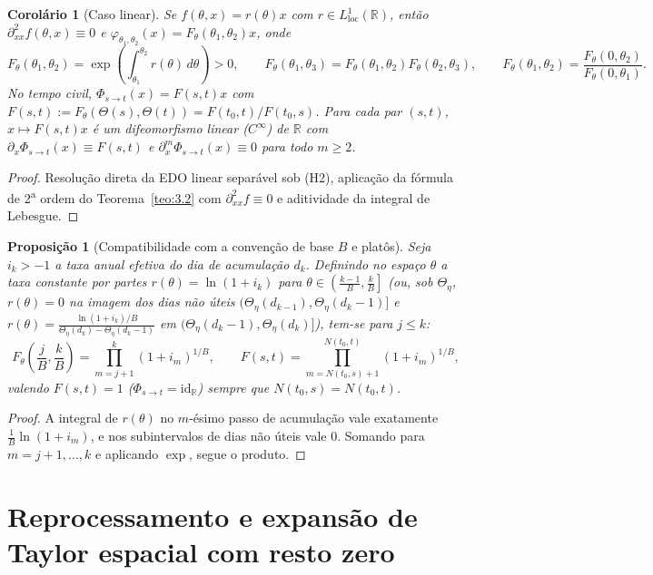 \documentclass[11pt, a4paper]{article}
\theoremstyle{definition}
\theoremstyle{plain}
\newtheorem{proposicao}[definicao]{Proposição}
\newtheorem{corolario}[definicao]{Corolário}
\theoremstyle{remark}
\begin{document}
\begin{corolario}[Caso linear]\label{cor:3.4}
Se $f(\theta, x) = r(\theta)x$ com $r \in L^1_{\text{loc}}(\mathbb{R})$, então $\partial_{xx}^2 f(\theta, x) \equiv 0$ e $\varphi_{\theta_1, \theta_2}(x) = F_\theta(\theta_1, \theta_2)x$, onde
\[
F_\theta(\theta_1, \theta_2) = \exp\left(\int_{\theta_1}^{\theta_2} r(\theta)\,d\theta\right) > 0, \qquad F_\theta(\theta_1, \theta_3) = F_\theta(\theta_1, \theta_2) F_\theta(\theta_2, \theta_3), \qquad F_\theta(\theta_1, \theta_2) = \frac{F_\theta(0, \theta_2)}{F_\theta(0, \theta_1)}.
\]
No tempo civil, $\Phi_{s \to t}(x) = F(s,t)x$ com $F(s,t) := F_\theta(\Theta(s), \Theta(t)) = F(t_0, t)/F(t_0, s)$. Para cada par $(s,t)$, $x \mapsto F(s,t)x$ é um difeomorfismo linear ($C^\infty$) de $\mathbb{R}$ com $\partial_x \Phi_{s \to t}(x) \equiv F(s,t)$ e $\partial_x^m \Phi_{s \to t}(x) \equiv 0$ para todo $m \ge 2$.
\end{corolario}
\begin{proof}
Resolução direta da EDO linear separável sob (H2), aplicação da fórmula de 2\textsuperscript{a} ordem do Teorema~\ref{teo:3.2} com $\partial_{xx}^2 f \equiv 0$ e aditividade da integral de Lebesgue.
\end{proof}

\begin{proposicao}[Compatibilidade com a convenção de base $B$ e platôs]\label{prop:3.5}
Seja $i_k > -1$ a taxa anual efetiva do dia de acumulação $d_k$. Definindo no espaço $\theta$ a taxa constante por partes $r(\theta) = \ln(1 + i_k)$ para $\theta \in \left(\frac{k-1}{B}, \frac{k}{B}\right]$ (ou, sob $\Theta_\eta$, $r(\theta) = 0$ na imagem dos dias não úteis $(\Theta_\eta(d_{k-1}), \Theta_\eta(d_k - 1)]$ e $r(\theta) = \frac{\ln(1+i_k)/B}{\Theta_\eta(d_k) - \Theta_\eta(d_k - 1)}$ em $(\Theta_\eta(d_k - 1), \Theta_\eta(d_k)]$), tem-se para $j \le k$:
\[
F_\theta\left(\frac{j}{B}, \frac{k}{B}\right) = \prod_{m = j+1}^{k} (1 + i_m)^{1/B}, \qquad F(s,t) = \prod_{m = N(t_0, s) + 1}^{N(t_0, t)} (1 + i_m)^{1/B},
\]
valendo $F(s,t) = 1$ ($\Phi_{s \to t} = \mathrm{id}_{\mathbb{R}}$) sempre que $N(t_0, s) = N(t_0, t)$.
\end{proposicao}
\begin{proof}
A integral de $r(\theta)$ no $m$-ésimo passo de acumulação vale exatamente $\frac{1}{B}\ln(1 + i_m)$, e nos subintervalos de dias não úteis vale $0$. Somando para $m = j+1, \dots, k$ e aplicando $\exp$, segue o produto.
\end{proof}

\section{Reprocessamento e expansão de Taylor espacial com resto zero}\label{sec:4}
\end{document}
